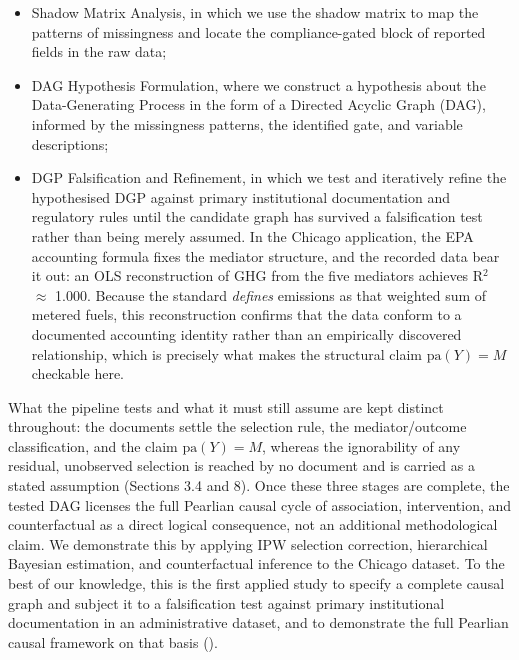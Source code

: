 \begin{itemize}
  \item Shadow Matrix Analysis, in which we use the shadow matrix to map the patterns of missingness and locate the compliance-gated block of reported fields in the raw data;
  \item DAG Hypothesis Formulation, where we construct a hypothesis about the Data-Generating Process in the form of a Directed Acyclic Graph (DAG), informed by the missingness patterns, the identified gate, and variable descriptions;
  \item DGP Falsification and Refinement, in which we test and iteratively refine the hypothesised DGP against primary institutional documentation and regulatory rules until the candidate graph has survived a falsification test rather than being merely assumed. In the Chicago application, the EPA accounting formula fixes the mediator structure, and the recorded data bear it out: an OLS reconstruction of GHG from the five mediators achieves R$^2$ $\approx$ 1.000. Because the standard \emph{defines} emissions as that weighted sum of metered fuels, this reconstruction confirms that the data conform to a documented accounting identity rather than an empirically discovered relationship, which is precisely what makes the structural claim $\mathrm{pa}(Y) = M$ checkable here.
\end{itemize}
What the pipeline tests and what it must still assume are kept distinct throughout: the documents settle the selection rule, the mediator/outcome classification, and the claim $\mathrm{pa}(Y) = M$, whereas the ignorability of any residual, unobserved selection is reached by no document and is carried as a stated assumption (Sections 3.4 and 8). Once these three stages are complete, the tested DAG licenses the full Pearlian causal cycle of association, intervention, and counterfactual as a direct logical consequence, not an additional methodological claim. We demonstrate this by applying IPW selection correction, hierarchical Bayesian estimation, and counterfactual inference to the Chicago dataset. To the best of our knowledge, this is the first applied study to specify a complete causal graph and subject it to a falsification test against primary institutional documentation in an administrative dataset, and to demonstrate the full Pearlian causal framework on that basis ().

